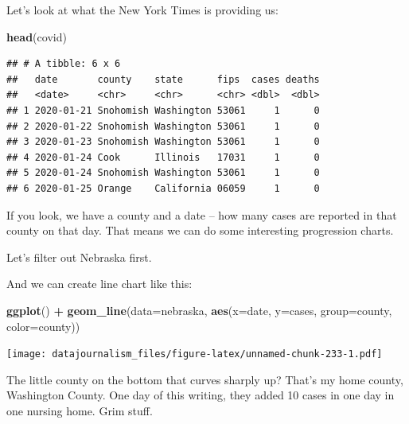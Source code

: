 \documentclass[]{book}
\newenvironment{Shaded}{\begin{snugshade}}{\end{snugshade}}
\newcommand{\DataTypeTok}[1]{\textcolor[rgb]{0.13,0.29,0.53}{#1}}
\newcommand{\KeywordTok}[1]{\textcolor[rgb]{0.13,0.29,0.53}{\textbf{#1}}}
\newcommand{\NormalTok}[1]{#1}
\newcommand{\OperatorTok}[1]{\textcolor[rgb]{0.81,0.36,0.00}{\textbf{#1}}}
\newcommand{\StringTok}[1]{\textcolor[rgb]{0.31,0.60,0.02}{#1}}
\begin{document}
Let's look at what the New York Times is providing us:

\begin{Shaded}
\begin{Highlighting}[]
\KeywordTok{head}\NormalTok{(covid)}
\end{Highlighting}
\end{Shaded}

\begin{verbatim}
## # A tibble: 6 x 6
##   date       county    state      fips  cases deaths
##   <date>     <chr>     <chr>      <chr> <dbl>  <dbl>
## 1 2020-01-21 Snohomish Washington 53061     1      0
## 2 2020-01-22 Snohomish Washington 53061     1      0
## 3 2020-01-23 Snohomish Washington 53061     1      0
## 4 2020-01-24 Cook      Illinois   17031     1      0
## 5 2020-01-24 Snohomish Washington 53061     1      0
## 6 2020-01-25 Orange    California 06059     1      0
\end{verbatim}

If you look, we have a county and a date -- how many cases are reported in that county on that day. That means we can do some interesting progression charts.

Let's filter out Nebraska first.

\begin{Shaded}
\end{Shaded}

And we can create line chart like this:

\begin{Shaded}
\begin{Highlighting}[]
\KeywordTok{ggplot}\NormalTok{() }\OperatorTok{+}\StringTok{ }\KeywordTok{geom_line}\NormalTok{(}\DataTypeTok{data=}\NormalTok{nebraska, }\KeywordTok{aes}\NormalTok{(}\DataTypeTok{x=}\NormalTok{date, }\DataTypeTok{y=}\NormalTok{cases, }\DataTypeTok{group=}\NormalTok{county, }\DataTypeTok{color=}\NormalTok{county))}
\end{Highlighting}
\end{Shaded}

\texttt{[image: datajournalism\_files/figure-latex/unnamed-chunk-233-1.pdf]}

The little county on the bottom that curves sharply up? That's my home county, Washington County. One day of this writing, they added 10 cases in one day in one nursing home. Grim stuff.
\end{document}
